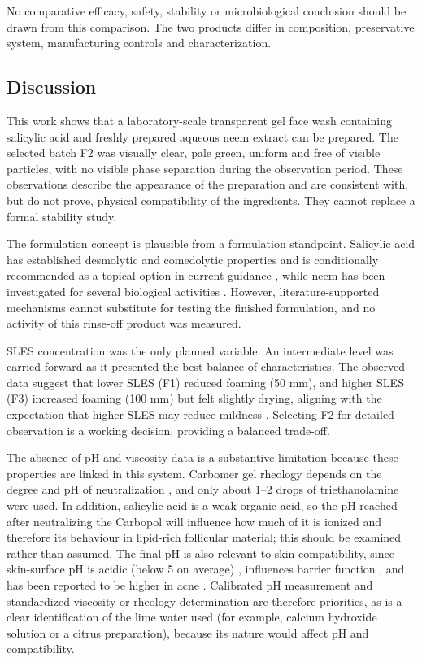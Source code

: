 \documentclass[10pt,a4paper,twocolumn]{article}
\begin{document}
No comparative efficacy, safety, stability or microbiological conclusion
should be drawn from this comparison. The two products differ in
composition, preservative system, manufacturing controls and
characterization.


\subsection*{Discussion}
\label{sec:discussion}

This work shows that a laboratory-scale transparent gel face wash
containing salicylic acid and freshly prepared aqueous neem extract can
be prepared. The selected batch F2 was visually clear, pale green,
uniform and free of visible particles, with no visible phase separation
during the observation period. These observations describe the appearance
of the preparation and are consistent with, but do not prove, physical
compatibility of the ingredients. They cannot replace a formal stability
study.

The formulation concept is plausible from a formulation standpoint.
Salicylic acid has established desmolytic and comedolytic properties
\citep{decker2012,arif2015} and is conditionally recommended as a topical
option in current guidance \citep{reynolds2024}, while neem has been
investigated for several biological activities
\citep{singh2021,kumar2013,gupta2017,alzohairy2016}. However,
literature-supported mechanisms cannot substitute for testing the finished
formulation, and no activity of this rinse-off product was measured.

SLES concentration was the only planned variable. An intermediate level
was carried forward as it presented the best balance of characteristics.
The observed data suggest that lower SLES (F1) reduced foaming (50 mm),
and higher SLES (F3) increased foaming (100 mm) but felt slightly drying,
aligning with the expectation that higher SLES may reduce mildness
\citep{ananthapadmanabhan2004,subramanyan2004}. Selecting F2 for detailed
observation is a working decision, providing a balanced trade-off.

The absence of pH and viscosity data is a substantive limitation because
these properties are linked in this system. Carbomer gel rheology depends
on the degree and pH of neutralization \citep{islam2004}, and only about
1--2 drops of triethanolamine were used. In addition, salicylic acid is a
weak organic acid, so the pH reached after neutralizing the Carbopol will
influence how much of it is ionized and therefore its behaviour in
lipid-rich follicular material; this should be examined rather than
assumed. The final pH is also relevant to skin compatibility, since
skin-surface pH is acidic (below 5 on average) \citep{lambers2006},
influences barrier function \citep{schmid2006}, and has been reported to
be higher in acne \citep{prakash2017}. Calibrated pH measurement and
standardized viscosity or rheology determination are therefore priorities,
as is a clear identification of the lime water used (for example, calcium
hydroxide solution or a citrus preparation), because its nature would
affect pH and compatibility.
\end{document}
